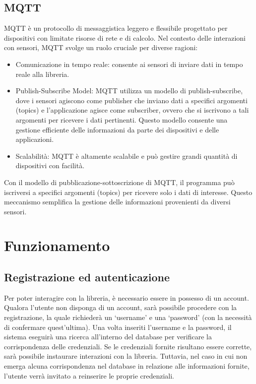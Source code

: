 \documentclass{rapportECL}
\begin{document}
\section{MQTT}
MQTT è un protocollo di messaggistica leggero e flessibile progettato per dispositivi con limitate risorse di rete e di calcolo.
Nel contesto delle interazioni con sensori, MQTT svolge un ruolo cruciale per diverse ragioni:
\begin{itemize}
  \item Comunicazione in tempo reale: consente ai sensori di inviare dati in tempo reale alla libreria.
  \item Publish-Subscribe Model: MQTT utilizza un modello di publish-subscribe, dove i sensori agiscono 
  come publisher che inviano dati a specifici argomenti (topics) e l'applicazione agisce come subscriber, ovvero che si 
  iscrivono a tali argomenti per ricevere i dati pertinenti. Questo modello consente una gestione efficiente delle 
  informazioni da parte dei dispositivi e delle applicazioni.
  \item Scalabilità: MQTT è altamente scalabile e può gestire grandi quantità di dispositivi con facilità.

\end{itemize}
Con il modello di pubblicazione-sottoscrizione di MQTT, il programma può iscriversi a specifici argomenti (topics) 
per ricevere solo i dati di interesse. Questo meccanismo semplifica la gestione delle informazioni provenienti da diversi sensori.

\chapter{Funzionamento}
\label{cha:funzionamento}

\section{Registrazione ed autenticazione}
Per poter interagire con la libreria, è necessario essere in possesso di un account. Qualora l'utente non disponga di un account, 
sarà possibile procedere con la registrazione, la quale richiederà un `username' e una `password' (con la necessità di confermare quest'ultima). 
Una volta inseriti l'username e la password, il sistema eseguirà una ricerca all'interno del database per verificare la corrispondenza delle credenziali.
Se le credenziali fornite risultano essere corrette, sarà possibile instaurare interazioni con la libreria. 
Tuttavia, nel caso in cui non emerga alcuna corrispondenza nel database in relazione alle informazioni fornite, 
l'utente verrà invitato a reinserire le proprie credenziali. 
\end{document}
